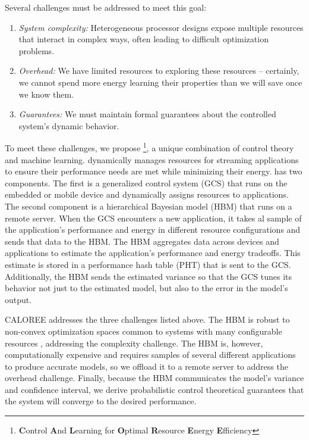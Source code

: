 Several challenges must be addressed to meet this goal:
\begin{enumerate}
\item \textit{System complexity:} Heterogeneous processor designs
  expose multiple resources that interact in complex ways, often
  leading to difficult optimization problems.
\item \textit{Overhead:} We have limited resources to exploring these
  resources -- certainly, we cannot spend more energy learning their
  properties than we will save once we know them.
\item \textit{Guarantees:} We must maintain formal guarantees about
  the controlled system's dynamic behavior.
\end{enumerate}


To meet these challenges, we propose
\SYSTEM{}\footnote{\textbf{C}ontrol \textbf{A}nd \textbf{L}earning for
  \textbf{O}ptimal \textbf{R}esource \textbf{E}nergy
  \textbf{E}fficiency}, a unique combination of control theory and
machine learning.  \SYSTEM{} dynamically manages resources for
streaming applications to ensure their performance needs are met while
minimizing their energy.  \SYSTEM{} has two components.  The first is
a generalized control system (GCS) that runs on the embedded or mobile
device and dynamically assigns resources to applications.  The second
component is a hierarchical Bayesian model (HBM) that runs on a remote
server.  When the GCS encounters a new application, it takes al sample
of the application's performance and energy in different resource
configurations and sends that data to the HBM.  The HBM aggregates
data across devices and applications to estimate the application's
performance and energy tradeoffs.  This estimate is stored in a
performance hash table (PHT) that is sent to the GCS.  Additionally,
the HBM sends the estimated variance so that the GCS tunes its
behavior not just to the estimated model, but also to the error in the
model's output.

CALOREE addresses the three challenges listed above.  The HBM is
robust to non-convex optimization spaces common to systems with many
configurable resources \cite{LEO}, addressing the complexity
challenge.  The HBM is, however, computationally expensive and
requires samples of several different applications to produce accurate
models, so we offload it to a remote server to address the overhead
challenge.  Finally, because the HBM communicates the model's variance
and confidence interval, we derive probabilistic control theoretical
guarantees that the system will converge to the desired performance.

